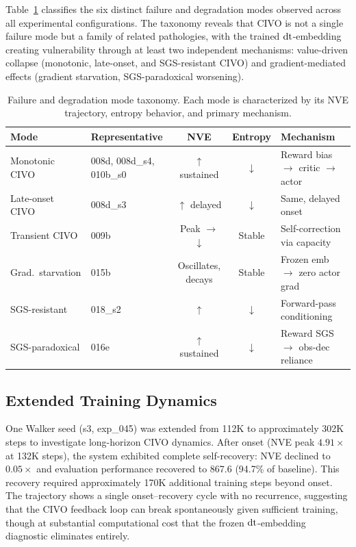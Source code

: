 Table~\ref{tab:failure_modes} classifies the six distinct failure and degradation modes observed across all experimental configurations. The taxonomy reveals that CIVO is not a single failure mode but a family of related pathologies, with the trained $\mathrm{dt}$-embedding creating vulnerability through at least two independent mechanisms: value-driven collapse (monotonic, late-onset, and SGS-resistant CIVO) and gradient-mediated effects (gradient starvation, SGS-paradoxical worsening).

\begin{table}[ht]
\centering
\caption{Failure and degradation mode taxonomy. Each mode is characterized by its NVE trajectory, entropy behavior, and primary mechanism.}
\label{tab:failure_modes}
\footnotesize
\setlength{\tabcolsep}{3pt}
\begin{tabular}{@{}llccl@{}}
\toprule
\textbf{Mode} & \textbf{Representative} & \textbf{NVE} & \textbf{Entropy} & \textbf{Mechanism} \\
\midrule
Monotonic CIVO & 008d, 008d\_s4, 010b\_s0 & $\uparrow$ sustained & $\downarrow$ & Reward bias $\to$ critic $\to$ actor \\
Late-onset CIVO & 008d\_s3 & $\uparrow$ delayed & $\downarrow$ & Same, delayed onset \\
Transient CIVO & 009b & Peak $\to$ $\downarrow$ & Stable & Self-correction via capacity \\
Grad.\ starvation & 015b & Oscillates, decays & Stable & Frozen emb $\to$ zero actor grad \\
SGS-resistant & 018\_s2 & $\uparrow$ & $\downarrow$ & Forward-pass conditioning \\
SGS-paradoxical & 016e & $\uparrow$ sustained & $\downarrow$ & Reward SGS $\to$ obs-dec reliance \\
\bottomrule
\end{tabular}
\end{table}

\subsection{Extended Training Dynamics}\label{sec:extended_training}

One Walker seed (s3, exp\_045) was extended from 112K to approximately 302K steps to investigate long-horizon CIVO dynamics. After onset (NVE peak $4.91\times$ at 132K steps), the system exhibited complete self-recovery: NVE declined to $0.05\times$ and evaluation performance recovered to 867.6 (94.7\% of baseline). This recovery required approximately 170K additional training steps beyond onset. The trajectory shows a single onset--recovery cycle with no recurrence, suggesting that the CIVO feedback loop can break spontaneously given sufficient training, though at substantial computational cost that the frozen $\mathrm{dt}$-embedding diagnostic eliminates entirely.


